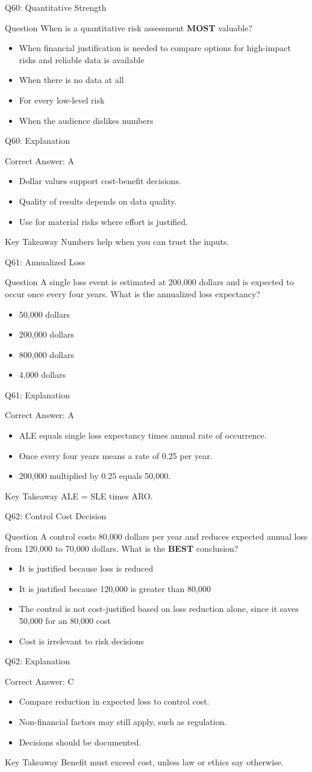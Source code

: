\documentclass[aspectratio=169]{beamer}
\newcommand{\hq}[7]{%
	\begin{frame}{Q#1: #2}
		\begin{block}{Question}
			#3
		\end{block}
		\begin{itemize}
			#4
		\end{itemize}
	\end{frame}
	\begin{frame}{Q#1: Explanation}
		\begin{block}{Correct Answer: #5}
			\begin{itemize}
				#6
			\end{itemize}
		\end{block}
		\begin{alertblock}{Key Takeaway}
			#7
		\end{alertblock}
	\end{frame}
}
\begin{document}
	\hq{60}{Quantitative Strength}
	{When is a quantitative risk assessment \textbf{MOST} valuable?}
	{\item[\textbf{(A)}] When financial justification is needed to compare options for high-impact risks and reliable data is available
		\item[\textbf{(B)}] When there is no data at all
		\item[\textbf{(C)}] For every low-level risk
		\item[\textbf{(D)}] When the audience dislikes numbers}
	{A}
	{\item Dollar values support cost-benefit decisions.
		\item Quality of results depends on data quality.
		\item Use for material risks where effort is justified.}
	{Numbers help when you can trust the inputs.}
	
	\hq{61}{Annualized Loss}
	{A single loss event is estimated at 200,000 dollars and is expected to occur once every four years. What is the annualized loss expectancy?}
	{\item[\textbf{(A)}] 50,000 dollars
		\item[\textbf{(B)}] 200,000 dollars
		\item[\textbf{(C)}] 800,000 dollars
		\item[\textbf{(D)}] 4,000 dollars}
	{A}
	{\item ALE equals single loss expectancy times annual rate of occurrence.
		\item Once every four years means a rate of 0.25 per year.
		\item 200,000 multiplied by 0.25 equals 50,000.}
	{ALE = SLE times ARO.}
	
	\hq{62}{Control Cost Decision}
	{A control costs 80,000 dollars per year and reduces expected annual loss from 120,000 to 70,000 dollars. What is the \textbf{BEST} conclusion?}
	{\item[\textbf{(A)}] It is justified because loss is reduced
		\item[\textbf{(B)}] It is justified because 120,000 is greater than 80,000
		\item[\textbf{(C)}] The control is not cost-justified based on loss reduction alone, since it saves 50,000 for an 80,000 cost
		\item[\textbf{(D)}] Cost is irrelevant to risk decisions}
	{C}
	{\item Compare reduction in expected loss to control cost.
		\item Non-financial factors may still apply, such as regulation.
		\item Decisions should be documented.}
	{Benefit must exceed cost, unless law or ethics say otherwise.}
	
\end{document}
